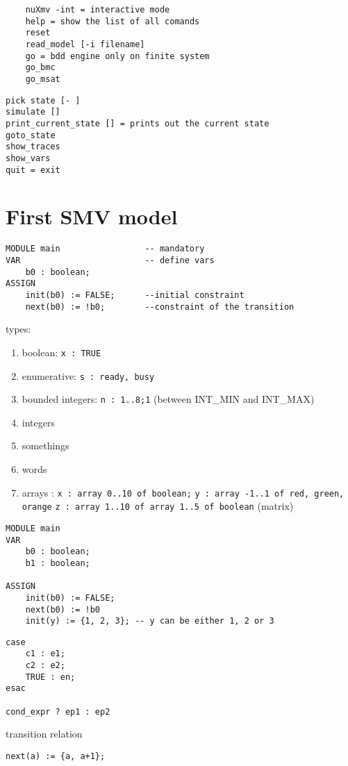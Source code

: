 \documentclass[11pt]{article}
\begin{document}
\begin{lstlisting}
	nuXmv -int = interactive mode
	help = show the list of all comands
	reset 
	read_model [-i filename]
	go = bdd engine only on finite system
	go_bmc 
	go_msat
\end{lstlisting}

\begin{lstlisting}
pick state [- ]
simulate []
print_current_state [] = prints out the current state	
goto_state 
show_traces
show_vars
quit = exit
\end{lstlisting}

\section{First SMV model} %
\label{sec:first_smv_model}
\begin{lstlisting}
MODULE main 				-- mandatory
VAR 						-- define vars
	b0 : boolean;
ASSIGN
	init(b0) := FALSE;		--initial constraint
	next(b0) := !b0;		--constraint of the transition
\end{lstlisting}

types:
\begin{enumerate}
	\item boolean: \texttt{x : TRUE}
	\item enumerative: \texttt{s : {ready, busy}}
	\item bounded integers: \texttt{n : 1..8;1} (between INT\_MIN and INT\_MAX)
	\item integers
	\item somethings
	\item words
	\item arrays : \texttt{x : array 0..10 of boolean;} 
		\texttt{y : array -1..1 of {red, green, orange}} 
		\texttt{z : array 1..10 of array 1..5 of boolean} (matrix)
\end{enumerate}

\begin{lstlisting}
MODULE main
VAR
	b0 : boolean;
	b1 : boolean;

ASSIGN
	init(b0) := FALSE;
	next(b0) := !b0
	init(y) := {1, 2, 3}; -- y can be either 1, 2 or 3
\end{lstlisting}

\begin{lstlisting}
case
	c1 : e1;
	c2 : e2;
	TRUE : en;
esac

cond_expr ? ep1 : ep2
\end{lstlisting}

transition relation
\begin{lstlisting}
next(a) := {a, a+1};
\end{lstlisting}
\end{document}
